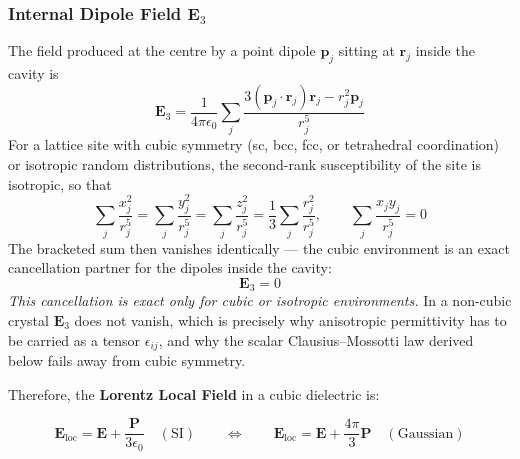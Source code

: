 \documentclass[11pt,a4paper]{article}
\begin{document}
\subsubsection{Internal Dipole Field \texorpdfstring{$\mathbf{E}_3$}{E3}}
The field produced at the centre by a point dipole $\mathbf{p}_j$ sitting at $\mathbf{r}_j$ inside the cavity is
\begin{equation}
    \mathbf{E}_3 = \frac{1}{4\pi\epsilon_0}\sum_j \frac{3(\mathbf{p}_j \cdot \mathbf{r}_j)\mathbf{r}_j - r_j^2 \mathbf{p}_j}{r_j^5}
\end{equation}
For a lattice site with cubic symmetry (sc, bcc, fcc, or tetrahedral coordination) or isotropic random distributions, the second-rank susceptibility of the site is isotropic, so that
\begin{equation}
    \sum_j \frac{x_j^2}{r_j^5} = \sum_j \frac{y_j^2}{r_j^5} = \sum_j \frac{z_j^2}{r_j^5} = \frac{1}{3}\sum_j \frac{r_j^2}{r_j^5}, \qquad \sum_j \frac{x_jy_j}{r_j^5} = 0
\end{equation}
The bracketed sum then vanishes identically --- the cubic environment is an exact cancellation partner for the dipoles inside the cavity:
\begin{equation}
    \mathbf{E}_3 = 0
\end{equation}
\emph{This cancellation is exact only for cubic or isotropic environments.} In a non-cubic crystal $\mathbf{E}_3$ does not vanish, which is precisely why anisotropic permittivity has to be carried as a tensor $\epsilon_{ij}$, and why the scalar Clausius--Mossotti law derived below fails away from cubic symmetry.

Therefore, the \textbf{Lorentz Local Field} in a cubic dielectric is:
\begin{tcolorbox}[colback=blue!5!white,colframe=primary!70!black,title=Lorentz local field]
\begin{equation}
    \mathbf{E}_{\text{loc}} = \mathbf{E} + \frac{\mathbf{P}}{3\epsilon_0}\quad (\mathrm{SI}) \qquad \Longleftrightarrow \qquad \mathbf{E}_{\text{loc}} = \mathbf{E} + \frac{4\pi}{3}\mathbf{P}\quad (\mathrm{Gaussian})
\end{equation}
\end{tcolorbox}
\end{document}
